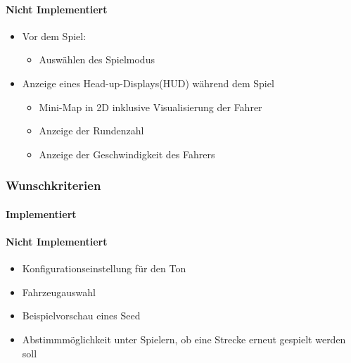 \paragraph{Nicht Implementiert}
\begin{itemize}
    \item Vor dem Spiel:
    \begin{itemize}
        \item Auswählen des Spielmodus
    \end{itemize}
    \item Anzeige eines Head-up-Displays(HUD) während dem Spiel
    \begin{itemize}
        \item Mini-Map in 2D inklusive Visualisierung der Fahrer
        \item Anzeige der Rundenzahl
        \item Anzeige der Geschwindigkeit des Fahrers
    \end{itemize}
\end{itemize}

\subsubsection{Wunschkriterien}

\paragraph{Implementiert}

\paragraph{Nicht Implementiert}
\begin{itemize}
    \item Konfigurationseinstellung für den Ton
    \item Fahrzeugauswahl
    \item Beispielvorschau eines Seed
    \item Abstimmmöglichkeit unter Spielern, ob eine Strecke erneut gespielt werden soll
\end{itemize}